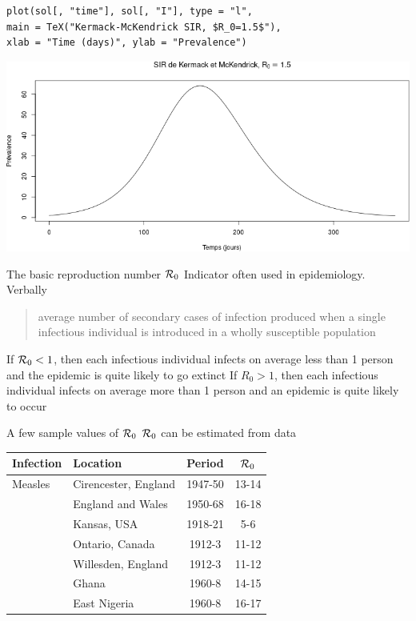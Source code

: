\documentclass[aspectratio=43]{beamer}
\begin{document}
\begin{frame}[fragile]{}
\begin{lstlisting}
plot(sol[, "time"], sol[, "I"], type = "l",
main = TeX("Kermack-McKendrick SIR, $R_0=1.5$"),
xlab = "Time (days)", ylab = "Prevalence")
\end{lstlisting}
\begin{center}
  \includegraphics[width=\textwidth]{../FIGS/sol_SIR_KMK_R015}
\end{center}
\end{frame}

\begin{frame}{The basic reproduction number $\mathcal{R}_0$}
\bbullet Indicator often used in epidemiology. Verbally
\begin{quote}
  average number of secondary cases of infection produced when a single infectious individual is introduced in a wholly susceptible population
\end{quote}
\vfill
\bbullet If $\mathcal{R}_0<1$, then each infectious individual infects on average less than 1 person and the epidemic is quite likely to go extinct 
\vfill
\bbullet If $R_0>1$, then each infectious individual infects on average more than 1 person and an epidemic is quite likely to occur
\end{frame}

\begin{frame}{A few sample values of $\mathcal{R}_0$}
  $\mathcal{R}_0$ can be estimated from data
  \vfill
  \begin{center}
  \begin{tabular}{llcc}
  \hline 
  Infection & Location & Period & $\mathcal{R}_0$ \\
  \hline
  Measles & Cirencester, England & 1947-50 & 13-14 \\
  & England and Wales & 1950-68 & 16-18 \\
  & Kansas, USA & 1918-21 & 5-6 \\
  & Ontario, Canada & 1912-3 & 11-12 \\
  & Willesden, England & 1912-3 & 11-12 \\
  & Ghana & 1960-8 & 14-15 \\
  & East Nigeria & 1960-8 & 16-17 \\
  \end{tabular}
  \end{center}
\end{frame}
    
\end{document}
